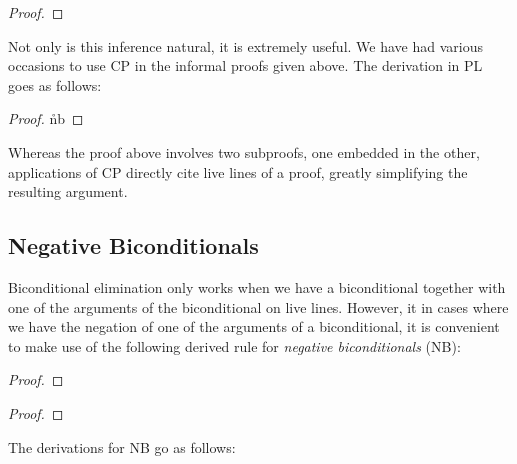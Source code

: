 \begin{proof}
\end{proof}

Not only is this inference natural, it is extremely useful.
We have had various occasions to use CP in the informal proofs given above.
The derivation in PL goes as follows:

\begin{proof}
  \open 
     \as{}
    \open
     \as{}
     
     \r{nb}
    \close
   
  \close
   
\end{proof}

Whereas the proof above involves two subproofs, one embedded in the other, applications of CP directly cite live lines of a proof, greatly simplifying the resulting argument.





\subsection{Negative Biconditionals}

Biconditional elimination only works when we have a biconditional together with one of the arguments of the biconditional on live lines.
However, it in cases where we have the negation of one of the arguments of a biconditional, it is convenient to make use of the following derived rule for \textit{negative biconditionals} (NB):

\begin{multicols}{2}

\begin{proof}
\end{proof}

\begin{proof}
\end{proof}

\end{multicols}

The derivations for NB go as follows:

